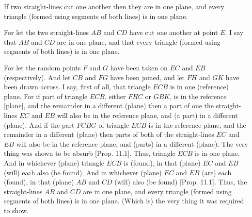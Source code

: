 \begin{Parallel}{}{}
{If two straight-lines cut one another then they are
in one plane, and every triangle (formed using segments of
both lines) is in one plane.

\centerline{}

For let the two straight-lines $AB$ and $CD$ have cut one another at point
$E$. I say that $AB$ and $CD$ are in one plane, and that every
triangle (formed using segments of both lines) is in one plane.

For let the random points $F$ and $G$ have been taken on $EC$ and
$EB$ (respectively). And let $CB$ and $FG$ have been joined, and let
$FH$ and $GK$ have been drawn across. I say, first of all, that triangle
$ECB$ is in one (reference) plane. For if part of triangle $ECB$, either $FHC$ or
$GBK$, is in the reference [plane], and the remainder in a different (plane)
then a part  of one the straight-lines $EC$ and $EB$
will also be in the reference plane, and (a part) in a different (plane).
And if the part $FCBG$ of triangle $ECB$ is in the reference plane, and
the remainder in a different (plane) then parts of both of the straight-lines
$EC$ and $EB$ will also be in  the reference plane, and (parts) in a
different (plane). The very thing was shown to be absurb [Prop. 11.1]. Thus, triangle $ECB$ is in
one plane. And in whichever (plane) triangle $ECB$ is (found),  in that (plane) $EC$ and $EB$ (will) each also (be found). And in whichever (plane) 
 $EC$
and $EB$ (are) each (found), in that (plane) $AB$ and $CD$ (will) also (be found)  [Prop. 11.1]. Thus, the straight-lines $AB$ and
$CD$ are in one plane, and every triangle (formed using segments of
both lines) is in one plane. (Which is) the very thing it was required to
show.}
\end{Parallel}

